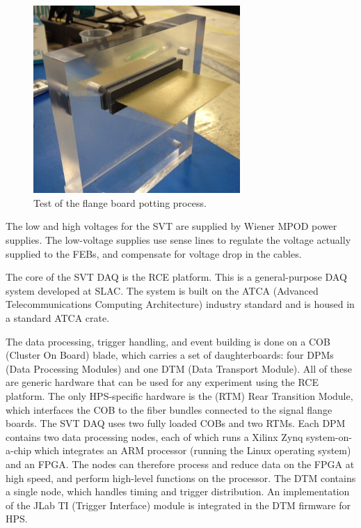 \begin{figure}[htp]
    \begin{center}
    \includegraphics[width=0.7\textwidth]{detector/figs/flangeboard_test}
    \end{center}
    \caption{Test of the flange board potting process.}
    \label{fig:flangeboard_test}
\end{figure}

The low and high voltages for the SVT are supplied by Wiener MPOD power supplies.
The low-voltage supplies use sense lines to regulate the voltage actually supplied to the FEBs, and compensate for voltage drop in the cables.

The core of the SVT DAQ is the RCE platform.
This is a general-purpose DAQ system developed at SLAC.
The system is built on the ATCA (Advanced Telecommunications Computing Architecture) industry standard and is housed in a standard ATCA crate.

The data processing, trigger handling, and event building is done on a COB (Cluster On Board) blade, which carries a set of daughterboards: four DPMs (Data Processing Modules) and one DTM (Data Transport Module).
All of these are generic hardware that can be used for any experiment using the RCE platform.
The only HPS-specific hardware is the (RTM) Rear Transition Module, which interfaces the COB to the fiber bundles connected to the signal flange boards.
The SVT DAQ uses two fully loaded COBs and two RTMs.
Each DPM contains two data processing nodes, each of which runs a Xilinx Zynq system-on-a-chip which integrates an ARM processor (running the Linux operating system) and an FPGA.
The nodes can therefore process and reduce data on the FPGA at high speed, and perform high-level functions on the processor.
The DTM contains a single node, which handles timing and trigger distribution.
An implementation of the JLab TI (Trigger Interface) module is integrated in the DTM firmware for HPS.

